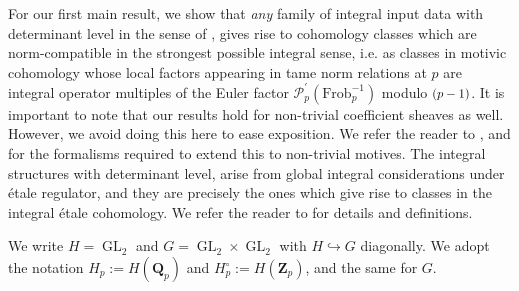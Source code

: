 \documentclass{amsart}%
\theoremstyle{plain}
\newcommand\scalemath[2]{\scalebox{#1}{\mbox{\ensuremath{\displaystyle #2}}}}
\theoremstyle{plain}
\theoremstyle{remark}
\DeclareMathOperator{\GL}{GL}
\begin{document}
For our first main result, we show that \textit{any} family of integral input data with determinant level in the sense of \cite{Loeffler_2021}, gives rise to cohomology classes which are norm-compatible in the strongest possible integral sense, i.e. as classes in motivic cohomology whose local factors appearing in tame norm relations at $p$ are integral operator multiples of the Euler factor $\mathcal{P}_p^{'}(\mathrm{Frob}_p^{-1})$ modulo $\scalemath{0.9}{(p-1)}$. It is important to note that our results hold for non-trivial coefficient sheaves as well. However, we avoid doing this here to ease exposition. We refer the reader to \cite{Loeffler_2021}, \cite{Loeffler_Skinner_Zerbes_2021} and \cite{grossi2020norm} for the formalisms required to extend this to non-trivial motives. The integral structures with determinant level, arise from global integral considerations under \'etale regulator, and they are precisely the ones which give rise to classes in the integral \'etale cohomology. We refer the reader to  for details and definitions. 

We write $H=\GL_2$ and $G=\GL_2\times \GL_2$ with $H\hookrightarrow G$ diagonally. We adopt the notation $H_p:=H(\mathbf{Q}_p)$ and $H_p^\circ:=H(\mathbf{Z}_p)$, and the same for $G$. 
\end{document}
